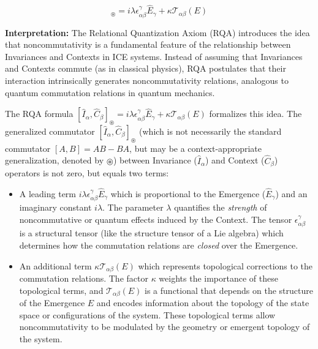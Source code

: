 \documentclass{article}
\begin{document}
\bigskip
\begin{equation}
[\hat{I}_\alpha, \hat{C}_\beta]_{\circledast} = i\lambda \epsilon_{\alpha\beta}^\gamma \hat{E}_\gamma + \kappa \mathcal{T}_{\alpha\beta}(E)
\end{equation}

\textbf{Interpretation:} The Relational Quantization Axiom (RQA) introduces the idea that noncommutativity is a fundamental feature of the relationship between Invariances and Contexts in ICE systems. Instead of assuming that Invariances and Contexts commute (as in classical physics), RQA postulates that their interaction intrinsically generates noncommutativity relations, analogous to quantum commutation relations in quantum mechanics.

The RQA formula $[\hat{I}_\alpha, \hat{C}_\beta]_{\circledast} = i\lambda \epsilon_{\alpha\beta}^\gamma \hat{E}_\gamma + \kappa \mathcal{T}_{\alpha\beta}(E)$ formalizes this idea. The generalized commutator $[\hat{I}_\alpha, \hat{C}_\beta]_{\circledast}$ (which is not necessarily the standard commutator $[A,B]=AB-BA$, but may be a context-appropriate generalization, denoted by $\circledast$) between Invariance ($\hat{I}_\alpha$) and Context ($\hat{C}_\beta$) operators is not zero, but equals two terms:

\begin{itemize}
 \item A leading term $i\lambda \epsilon_{\alpha\beta}^\gamma \hat{E}_\gamma$ which is proportional to the Emergence ($\hat{E}_\gamma$) and an imaginary constant $i\lambda$. The parameter $\lambda$ quantifies the \textit{strength} of noncommutative or quantum effects induced by the Context. The tensor $\epsilon_{\alpha\beta}^\gamma$ is a structural tensor (like the structure tensor of a Lie algebra) which determines how the commutation relations are \textit{closed} over the Emergence.

\item An additional term $\kappa \mathcal{T}_{\alpha\beta}(E)$ which represents topological corrections to the commutation relations. The factor $\kappa$ weights the importance of these topological terms, and $\mathcal{T}_{\alpha\beta}(E)$ is a functional that depends on the structure of the Emergence $E$ and encodes information about the topology of the state space or configurations of the system. These topological terms allow noncommutativity to be modulated by the geometry or emergent topology of the system.
\end{itemize}
\end{document}
